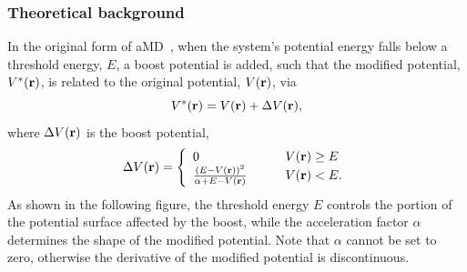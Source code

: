 \subsubsection{Theoretical background}
In the original form of aMD~\cite{HAME2004mc}, when the system's potential energy falls       
below a threshold energy, $E$, a boost potential is added, 
such that the modified potential, $V^*({\bf r})$, is related to the original
potential, $V({\bf r})$, via
\begin{equation}
V^*({\bf r})= V({\bf r}) + \Delta V({\bf r}),
\end{equation}
where $\Delta V({\bf r})$ is the boost potential, 
\begin{equation} 
\Delta V({\bf r})= \left \{
\begin{array}{l l}
0   & \quad \quad V({\bf r})\geq E \\  
\frac{(E-V({\bf r}))^2}{\alpha+E-V({\bf r})}  & \quad \quad V({\bf r})<E. \\
\end{array} \right. 
\end{equation}
As shown in the following figure, the threshold energy $E$ controls the portion of 
the potential surface affected by the boost, while the acceleration factor 
$\alpha$ determines the shape of the modified potential.
Note that $\alpha$ cannot be set to zero, otherwise the derivative of the modified potential
is discontinuous.

